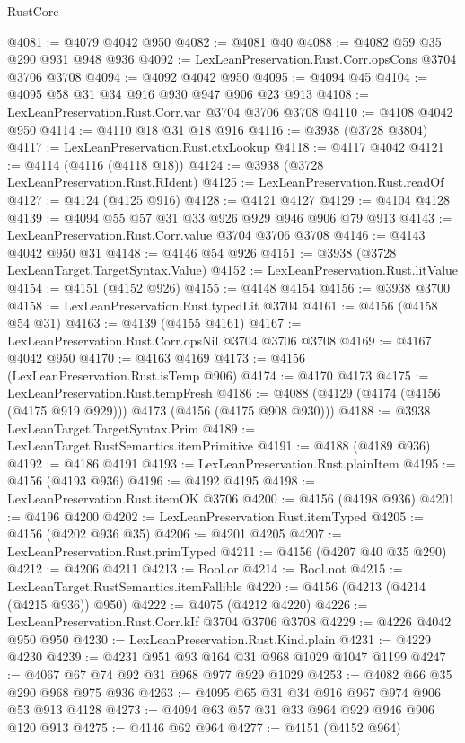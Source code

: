 \begin{lexlean}{RustCore}
\begin{coremodule}
@4081 := @4079 @4042 @950
@4082 := @4081 @40
@4088 := @4082 @59 @35 @290 @931 @948 @936
@4092 := LexLeanPreservation.Rust.Corr.opsCons @3704 @3706 @3708
@4094 := @4092 @4042 @950
@4095 := @4094 @45
@4104 := @4095 @58 @31 @34 @916 @930 @947 @906 @23 @913
@4108 := LexLeanPreservation.Rust.Corr.var @3704 @3706 @3708
@4110 := @4108 @4042 @950
@4114 := @4110 @18 @31 @18 @916
@4116 := @3938 (@3728 @3804)
@4117 := LexLeanPreservation.Rust.ctxLookup
@4118 := @4117 @4042
@4121 := @4114 (@4116 (@4118 @18))
@4124 := @3938 (@3728 LexLeanPreservation.Rust.RIdent)
@4125 := LexLeanPreservation.Rust.readOf
@4127 := @4124 (@4125 @916)
@4128 := @4121 @4127
@4129 := @4104 @4128
@4139 := @4094 @55 @57 @31 @33 @926 @929 @946 @906 @79 @913
@4143 := LexLeanPreservation.Rust.Corr.value @3704 @3706 @3708
@4146 := @4143 @4042 @950 @31
@4148 := @4146 @54 @926
@4151 := @3938 (@3728 LexLeanTarget.TargetSyntax.Value)
@4152 := LexLeanPreservation.Rust.litValue
@4154 := @4151 (@4152 @926)
@4155 := @4148 @4154
@4156 := @3938 @3700
@4158 := LexLeanPreservation.Rust.typedLit @3704
@4161 := @4156 (@4158 @54 @31)
@4163 := @4139 (@4155 @4161)
@4167 := LexLeanPreservation.Rust.Corr.opsNil @3704 @3706 @3708
@4169 := @4167 @4042 @950
@4170 := @4163 @4169
@4173 := @4156 (LexLeanPreservation.Rust.isTemp @906)
@4174 := @4170 @4173
@4175 := LexLeanPreservation.Rust.tempFresh
@4186 := @4088 (@4129 (@4174 (@4156 (@4175 @919 @929))) @4173 (@4156 (@4175 @908 @930)))
@4188 := @3938 LexLeanTarget.TargetSyntax.Prim
@4189 := LexLeanTarget.RustSemantics.itemPrimitive
@4191 := @4188 (@4189 @936)
@4192 := @4186 @4191
@4193 := LexLeanPreservation.Rust.plainItem
@4195 := @4156 (@4193 @936)
@4196 := @4192 @4195
@4198 := LexLeanPreservation.Rust.itemOK @3706
@4200 := @4156 (@4198 @936)
@4201 := @4196 @4200
@4202 := LexLeanPreservation.Rust.itemTyped
@4205 := @4156 (@4202 @936 @35)
@4206 := @4201 @4205
@4207 := LexLeanPreservation.Rust.primTyped
@4211 := @4156 (@4207 @40 @35 @290)
@4212 := @4206 @4211
@4213 := Bool.or
@4214 := Bool.not
@4215 := LexLeanTarget.RustSemantics.itemFallible
@4220 := @4156 (@4213 (@4214 (@4215 @936)) @950)
@4222 := @4075 (@4212 @4220)
@4226 := LexLeanPreservation.Rust.Corr.kIf @3704 @3706 @3708
@4229 := @4226 @4042 @950 @950
@4230 := LexLeanPreservation.Rust.Kind.plain
@4231 := @4229 @4230
@4239 := @4231 @951 @93 @164 @31 @968 @1029 @1047 @1199
@4247 := @4067 @67 @74 @92 @31 @968 @977 @929 @1029
@4253 := @4082 @66 @35 @290 @968 @975 @936
@4263 := @4095 @65 @31 @34 @916 @967 @974 @906 @53 @913 @4128
@4273 := @4094 @63 @57 @31 @33 @964 @929 @946 @906 @120 @913
@4275 := @4146 @62 @964
@4277 := @4151 (@4152 @964)

\end{coremodule}
\end{lexlean}
